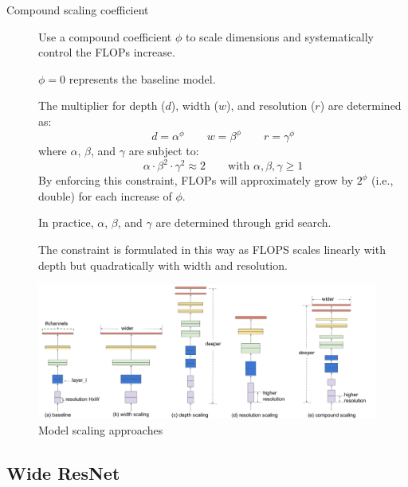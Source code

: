 \begin{description}
        \begin{description}
            \item[Compound scaling coefficient]
                Use a compound coefficient $\phi$ to scale dimensions and systematically control the FLOPs increase.
                \begin{remark}
                    $\phi=0$ represents the baseline model.
                \end{remark}

                The multiplier for depth ($d$), width ($w$), and resolution ($r$) are determined as:
                \[ d = \alpha^\phi \qquad w = \beta^\phi \qquad r = \gamma^\phi \]
                where $\alpha$, $\beta$, and $\gamma$ are subject to:
                \[ \alpha \cdot \beta^2 \cdot \gamma^2 \approx 2 \qquad \text{with } \alpha, \beta, \gamma \geq 1 \]
                By enforcing this constraint, FLOPs will approximately grow by $2^\phi$ (i.e., double) for each increase of $\phi$. 

                In practice, $\alpha$, $\beta$, and $\gamma$ are determined through grid search.

                \begin{remark}
                    The constraint is formulated in this way as FLOPS scales linearly with depth but quadratically with width and resolution.
                \end{remark}
        \end{description}
\end{description}

\begin{figure}[H]
    \centering
    \includegraphics[width=0.95\linewidth]{./img/_model_scaling.jpg}
    \caption{Model scaling approaches}
\end{figure}


\subsection{Wide ResNet}


